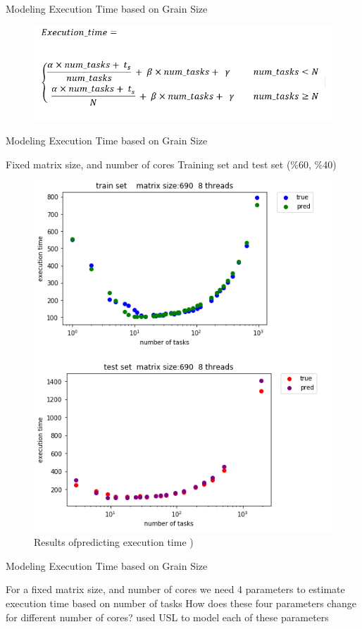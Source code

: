 \documentclass[10pt]{beamer}
\begin{document}
\begin{frame}{Modeling Execution Time based on Grain Size}
\begin{outline}		
	\begin{figure}
		\includegraphics[width=0.9\linewidth]{figures/formula.png}			
	\end{figure}
\end{outline}
\end{frame}

\begin{frame}{Modeling Execution Time based on Grain Size}
\begin{outline}	
	\1Fixed matrix size, and number of cores	
	\1Training set and test set (\%60, \%40)
	\begin{figure}
		\includegraphics[width=0.6\linewidth]{figures/pred_1.png}	
		\caption{Results ofpredicting execution time )}	
	\end{figure}
\end{outline}
\end{frame}

\begin{frame}{Modeling Execution Time based on Grain Size}
\begin{outline}	
	\1For a fixed matrix size, and number of cores we need 4 parameters to estimate execution time based on number of tasks
    \1How does these four parameters change for different number of cores?
    \2used USL to model each of these parameters
\end{outline}
\end{frame}
\end{document}

